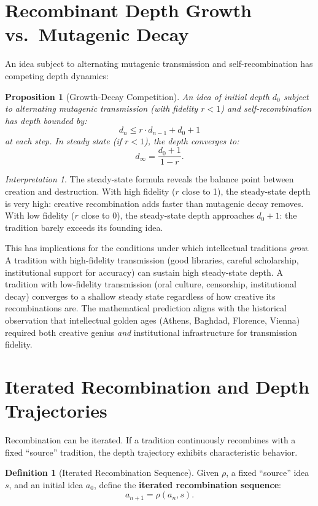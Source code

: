 \documentclass[11pt,openany]{book}
\theoremstyle{definition}
\newtheorem{definition}[axiom]{Definition}
\theoremstyle{plain}
\newtheorem{proposition}[axiom]{Proposition}
\theoremstyle{remark}
\newtheorem{interpretation}[axiom]{Interpretation}
\begin{document}
\section{Recombinant Depth Growth vs.\ Mutagenic Decay}

An idea subject to alternating mutagenic transmission and self-recombination has competing depth dynamics:

\begin{proposition}[Growth-Decay Competition]
An idea of initial depth $d_0$ subject to alternating mutagenic transmission (with fidelity $r < 1$) and self-recombination has depth bounded by:
\[
d_n \leq r \cdot d_{n-1} + d_0 + 1
\]
at each step. In steady state (if $r < 1$), the depth converges to:
\[
d_\infty = \frac{d_0 + 1}{1 - r}.
\]
\end{proposition}

\begin{interpretation}
The steady-state formula reveals the balance point between creation and destruction. With high fidelity ($r$ close to 1), the steady-state depth is very high: creative recombination adds faster than mutagenic decay removes. With low fidelity ($r$ close to 0), the steady-state depth approaches $d_0 + 1$: the tradition barely exceeds its founding idea.

This has implications for the conditions under which intellectual traditions \emph{grow}. A tradition with high-fidelity transmission (good libraries, careful scholarship, institutional support for accuracy) can sustain high steady-state depth. A tradition with low-fidelity transmission (oral culture, censorship, institutional decay) converges to a shallow steady state regardless of how creative its recombinations are. The mathematical prediction aligns with the historical observation that intellectual golden ages (Athens, Baghdad, Florence, Vienna) required both creative genius \emph{and} institutional infrastructure for transmission fidelity.
\end{interpretation}

\section{Iterated Recombination and Depth Trajectories}

Recombination can be iterated. If a tradition continuously recombines with a fixed ``source'' tradition, the depth trajectory exhibits characteristic behavior.

\begin{definition}[Iterated Recombination Sequence]
Given $\rho$, a fixed ``source'' idea $s$, and an initial idea $a_0$, define the \textbf{iterated recombination sequence}:
\[
a_{n+1} = \rho(a_n, s).
\]
\end{definition}
\end{document}
